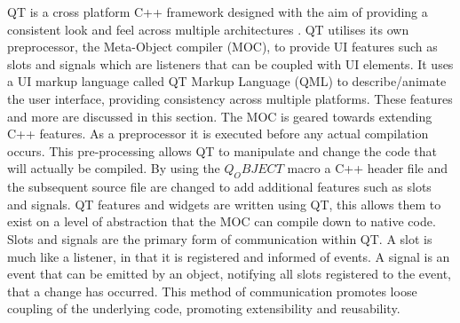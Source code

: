 QT is a cross platform C++ framework designed with the aim of providing a consistent look and feel across multiple architectures \cite{qt_about}. QT utilises its own preprocessor, the Meta-Object compiler (MOC), to provide UI features such as slots and signals which are listeners that can be coupled with UI elements. It uses a UI markup language called QT Markup Language (QML) to describe/animate the user interface, providing consistency across multiple platforms. These features and more are discussed in this section.
  The MOC is geared towards extending C++ features. As a preprocessor it is executed before any actual compilation occurs\cite{qt_moc}. This pre-processing allows QT to manipulate and change the code that will actually be compiled. By using the $Q_OBJECT$ macro a C++ header file and the subsequent source file are changed to add additional features such as slots and signals. QT features and widgets are written using QT, this allows them to exist on a level of abstraction that the MOC can compile down to native code.
  Slots and signals are the primary form of communication within QT\cite{qt_slotsnsignals}. A slot is much like a listener, in that it is registered and informed of events. A signal is an event that can be emitted by an object, notifying all slots registered to the event, that a change has occurred. This method of communication promotes loose coupling of the underlying code, promoting extensibility and reusability.

